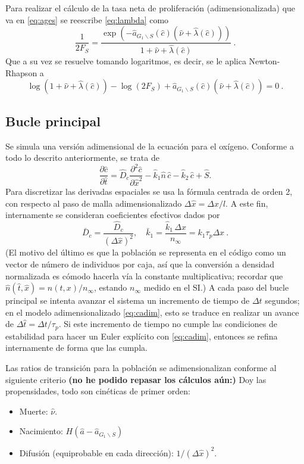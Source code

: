 \documentclass[12pt]{article}
\numberwithin{equation}{section}
\begin{document}
Para realizar el c\'alculo de la tasa neta de proliferaci\'on (adimensionalizada) que va en \eqref{eq:ages} se reescribe \eqref{eq:lambda} como
\[
\frac{1}{2F_S} = \frac{\exp \left(-\hat{a}_{G_1\backslash S}(\hat c) (\hat \nu +\hat \lambda(\hat c)) \right) }{1+\hat \nu +\hat \lambda(\hat c)}\:.
\]
Que a su vez se resuelve tomando logaritmos, es decir, se le aplica Newton-Rhapson a
\[
\log(1+\hat \nu +\hat \lambda(\hat c)) - \log(2 F_S) + \hat{a}_{G_1\backslash S}(\hat c) (\hat \nu +\hat \lambda(\hat c))=0\:.
\]
\subsection{Bucle principal}

Se simula una versi\'on adimensional de la ecuaci\'on para el ox\'igeno. Conforme a todo lo descrito anteriormente, se trata de
\begin{equation}
\label{eq:cadim}
 \frac{\partial \hat c}{\partial \hat t}=\hat D_c\frac{\partial^2 \hat c}{\partial \hat x^2}-\hat k_1 \hat n\, \hat c -\hat k_2\, \hat c+\hat S.
 \end{equation}
%
Para discretizar las derivadas espaciales se usa la f\'ormula centrada de orden 2, con respecto al paso de malla adimensionalizado $\Delta \hat x= \Delta x/l$. 
A este fin, internamente se consideran coeficientes efectivos dados por
\[
\bar D_c=\frac{\hat D_c}{(\Delta \hat x)^2},\quad \bar k_1=\frac{\hat k_1\, \Delta x}{n_\infty}=k_1 \tau_p \Delta x\:.
\]
(El motivo del \'ultimo es que la poblaci\'on se representa en el c\'odigo como un vector de n\'umero de individuos por caja, as\'i que la conversi\'on a densidad normalizada es c\'omodo hacerla v\'ia la constante multiplicativa; recordar que $\hat n(\hat t,\hat x)=n(t,x)/n_\infty$, estando $n_\infty$ medido en el SI.)
A cada paso del bucle principal se intenta avanzar el sistema un incremento de tiempo de $\Delta t$ segundos; en el modelo adimensionalizado \eqref{eq:cadim}, esto se traduce en realizar un avance de $\Delta \hat t=\Delta t /\tau_p$. Si este incremento de tiempo no cumple las condiciones de estabilidad para hacer un Euler expl\'icito con \eqref{eq:cadim}, entonces se refina internamente de forma que las cumpla.

Las ratios de transici\'on para la poblaci\'on se adimensionalizan conforme al siguiente criterio {\bf (no he podido repasar los c\'alculos a\'un:)} Doy las propensidades, todo son cin\'eticas de primer orden:
\begin{itemize}
\item Muerte: $\hat \nu$.
\item Nacimiento: $H(\hat a - \hat{a}_{G_1\backslash S})$
\item Difusi\'on (equiprobable en cada direcci\'on): $1/(\Delta \hat x)^2$.
\end{itemize}
\end{document}
